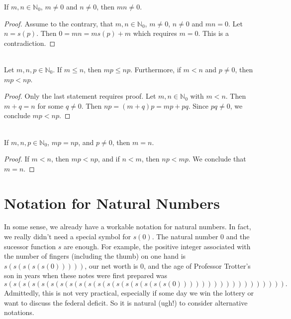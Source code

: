 \begin{lemma}
If $m,n\in \mathbb{N}_0$, $m\neq0$ and $n\neq0$, then $mn\neq0$.
\end{lemma}
\begin{proof}
Assume to the contrary, that $m,n\in \mathbb{N}_0$, $m\neq0$, $n\neq0$
and $mn=0$.  Let $n=s(p)$.  Then $0=mn= ms(p)+m$ which requires
$m=0$.  This is a contradiction.
\end{proof}

\begin{theorem}{}\\  
Let $m,n,p\in \mathbb{N}_0$.  If
$m\le n$, then $mp\le np$.  Furthermore, if $m<n$ and $p\neq0$,
then $mp<np$.
\end{theorem}

\begin{proof} Only the last statement requires proof.  Let 
$m,n\in\mathbb{N}_0$ with $m< n$.  Then $m+q=n$ for some $q\neq0$.
Then $np=(m+q)p=mp+pq$.  Since $pq\neq0$, we conclude $mp<np$.
\end{proof}

\begin{corollary}{}\\
If $m,n,p\in \mathbb{N}_0$, $mp=np$, and $p\neq 0$, then $m=n$.
\end{corollary}

\begin{proof}
If $m<n$, then $mp<np$, and if $n<m$, then
$np<mp$.  We conclude that $m=n$. 
\end{proof}

\section{Notation for Natural Numbers}\label{s:background:decimal}

In some sense, we already have a workable notation for natural numbers.
In fact, we really didn't need a special symbol for $s(0)$.
The natural number $0$ and the sucessor function $s$ are enough.
For example, the positive integer associated
with the number of fingers (including the thumb) 
on one hand is
$s(s(s(s(s(0)))))$, our net worth is $0$, and the age of Professor
Trotter's son in years when these notes were first prepared was
\[
s(s(s(s(s(s(s(s(s(s(s(s(s(s(s(s(s(s(0)))))))))))))))))).
\]
Admittedly, this is not very practical, especially if some day
we win the lottery or want to discuss the federal deficit. 
So it is natural (ugh!) to consider alternative notations.  

